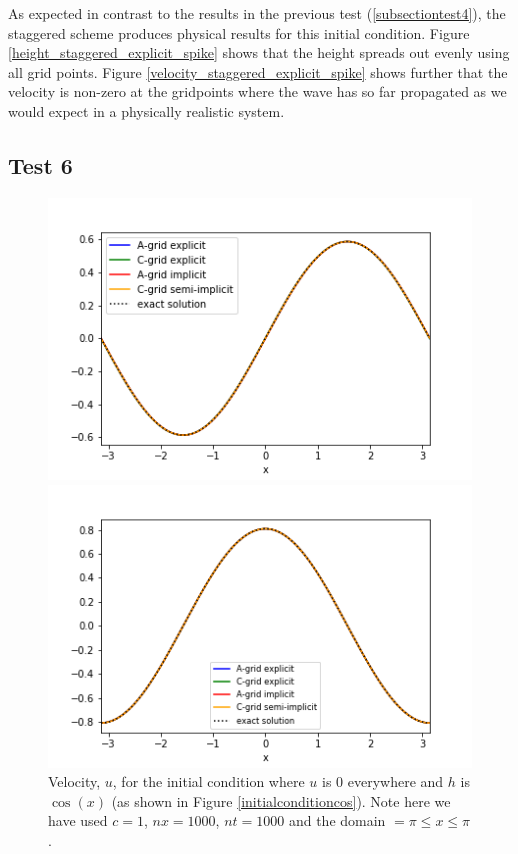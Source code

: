 \documentclass[a4paper,12pt, notitlepage]{article}
\begin{document}
{As expected in contrast to the results in the previous test (\ref{subsectiontest4}), the staggered scheme produces physical results for this initial condition. Figure \ref{height_staggered_explicit_spike} shows that the height spreads out evenly using all grid points. Figure \ref{velocity_staggered_explicit_spike} shows further that the velocity is non-zero at the gridpoints where the wave has so far propagated as we would expect in a physically realistic system.

\subsection{Test 6}
\begin{figure} [H]
	\begin{minipage}{.5\textwidth}
		\ContinuedFloat*
		\captionsetup{width=0.9\textwidth}
		\captionsetup{justification=centering}
		\includegraphics[width=\textwidth]{comparison_with_exact_u.png}
		\caption{\label{exact velocity} Velocity, $u$, for the initial condition where $u$ is 0 everywhere and $h$ is $\cos(x)$ (as shown in Figure \ref{initialconditioncos}). Note here we have used $c = 1$, $nx = 1000$, $nt = 1000$ and the domain $=\pi\leq x \leq \pi$.} 
	\end{minipage}
	\begin{minipage}{.5\textwidth}
		\ContinuedFloat
		\captionsetup{width=0.9\textwidth}
		\captionsetup{justification=centering}
		\includegraphics[width=\textwidth]{comparison_with_exact_h.png}

\end{minipage}
\end{figure}}
\end{document}
